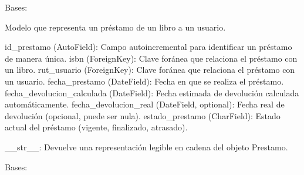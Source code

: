 \documentclass[letterpaper,10pt,spanish]{sphinxmanual}
\begin{document}
\begin{fulllineitems}
\label{\detokenize{modules/appprestamos:appprestamos.models.Prestamo}}
\pysigstartsignatures
{}
\pysigstopsignatures
\sphinxAtStartPar
Bases: 

\sphinxAtStartPar
Modelo que representa un préstamo de un libro a un usuario.
\begin{description}
\sphinxAtStartPar
id\_prestamo (AutoField): Campo autoincremental para identificar un préstamo de manera única.
isbn (ForeignKey): Clave foránea que relaciona el préstamo con un libro.
rut\_usuario (ForeignKey): Clave foránea que relaciona el préstamo con un usuario.
fecha\_prestamo (DateField): Fecha en que se realiza el préstamo.
fecha\_devolucion\_calculada (DateField): Fecha estimada de devolución calculada automáticamente.
fecha\_devolucion\_real (DateField, optional): Fecha real de devolución (opcional, puede ser nula).
estado\_prestamo (CharField): Estado actual del préstamo (vigente, finalizado, atrasado).

\sphinxAtStartPar
\_\_str\_\_: Devuelve una representación legible en cadena del objeto Prestamo.

\end{description}

\begin{fulllineitems}
\label{\detokenize{modules/appprestamos:appprestamos.models.Prestamo.DoesNotExist}}
\pysigstartsignatures
{}
\pysigstopsignatures
\sphinxAtStartPar
Bases: 

\end{fulllineitems}


\begin{fulllineitems}
\label{\detokenize{modules/appprestamos:appprestamos.models.Prestamo.ESTADOS_CHOICE}}
\pysigstartsignatures
{}
\pysigstopsignatures
\end{fulllineitems}


\end{fulllineitems}
\end{document}
